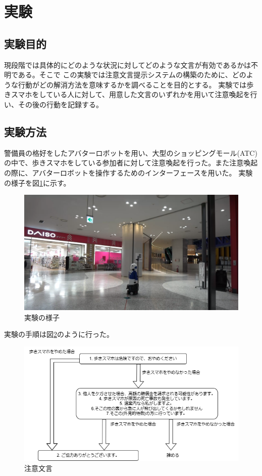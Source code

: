 \documentclass{kuisthesis}
\begin{document}
\section{実験}
\subsection{実験目的}
現段階では具体的にどのような状況に対してどのような文言が有効であるかは不明である。そこで
この実験では注意文言提示システムの構築のために、どのような行動がどの解消方法を意味するかを調べることを目的とする。
実験では歩きスマホをしている人に対して、用意した文言のいずれかを用いて注意喚起を行い、その後の行動を記録する。

\subsection{実験方法}
警備員の格好をしたアバターロボットを用い、大型のショッピングモール(ATC)の中で、歩きスマホをしている参加者に対して注意喚起を行った。また注意喚起の際に、アバターロボットを操作するためのインターフェースを用いた。
実験の様子を図\ref{fig: Experiment}に示す。
\begin{figure}[H]
  \includegraphics[width=15cm]{img/Experiment.png}
  \caption{実験の様子}
  \label{fig: Experiment}
\end{figure}
実験の手順は図\ref{fig: Strategy}のように行った。
\begin{figure}[h]
  \includegraphics[width=15cm]{img/waystostop.drawio.png}
  \caption{注意文言}
  \label{fig: Strategy}
\end{figure}
\end{document}
